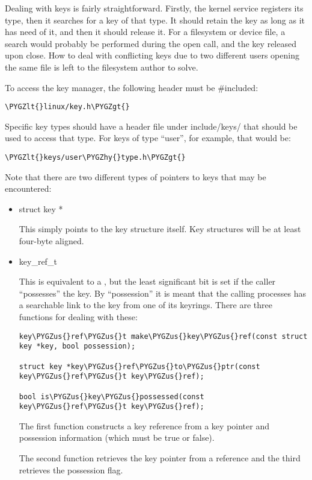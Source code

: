 \documentclass[a4paper,8pt,english]{sphinxmanual}
\def\PYGZus{\char`\_}
\def\PYGZlt{\char`\<}
\def\PYGZgt{\char`\>}
\def\PYGZhy{\char`\-}
\begin{document}
Dealing with keys is fairly straightforward. Firstly, the kernel service
registers its type, then it searches for a key of that type. It should retain
the key as long as it has need of it, and then it should release it. For a
filesystem or device file, a search would probably be performed during the open
call, and the key released upon close. How to deal with conflicting keys due to
two different users opening the same file is left to the filesystem author to
solve.

To access the key manager, the following header must be \#included:

\begin{Verbatim}[commandchars=\\\{\}]
\PYGZlt{}linux/key.h\PYGZgt{}
\end{Verbatim}

Specific key types should have a header file under include/keys/ that should be
used to access that type.  For keys of type ``user'', for example, that would be:

\begin{Verbatim}[commandchars=\\\{\}]
\PYGZlt{}keys/user\PYGZhy{}type.h\PYGZgt{}
\end{Verbatim}

Note that there are two different types of pointers to keys that may be
encountered:
\begin{itemize}
\item {} 
struct key *

This simply points to the key structure itself. Key structures will be at
least four-byte aligned.

\item {} 
key\_ref\_t

This is equivalent to a , but the least significant bit is set
if the caller ``possesses'' the key. By ``possession'' it is meant that the
calling processes has a searchable link to the key from one of its
keyrings. There are three functions for dealing with these:

\begin{Verbatim}[commandchars=\\\{\}]
key\PYGZus{}ref\PYGZus{}t make\PYGZus{}key\PYGZus{}ref(const struct key *key, bool possession);

struct key *key\PYGZus{}ref\PYGZus{}to\PYGZus{}ptr(const key\PYGZus{}ref\PYGZus{}t key\PYGZus{}ref);

bool is\PYGZus{}key\PYGZus{}possessed(const key\PYGZus{}ref\PYGZus{}t key\PYGZus{}ref);
\end{Verbatim}

The first function constructs a key reference from a key pointer and
possession information (which must be true or false).

The second function retrieves the key pointer from a reference and the
third retrieves the possession flag.

\end{itemize}
\end{document}
